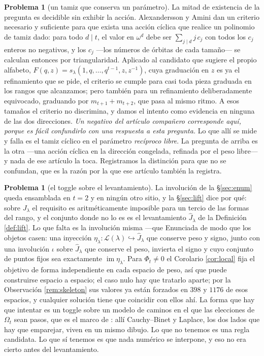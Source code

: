 \documentclass[11pt,reqno]{amsart}
\theoremstyle{plain}
\theoremstyle{definition}
\newtheorem{problem}[theorem]{Problema}
\begin{document}
\begin{problem}[un tamiz que conserva un parámetro]
La mitad de existencia de la pregunta es decidible sin exhibir la acción. Alexandersson y Amini
\cite{AA19} dan un criterio necesario y suficiente para que exista una acción cíclica que realice un
polinomio de tamiz dado: para todo $d\mid t$, el valor en $\omega^d$ debe ser
$\sum_{j\mid d}j\,c_j$ con todos los $c_j$ enteros no negativos, y los $c_j$ ---los números de
órbitas de cada tamaño--- se calculan entonces por triangularidad. Aplicado al candidato que sugiere
el propio alfabeto, $F(q,z)=s_\lambda(1,q,\dots,q^{t-1},z,z^{-1})$, cuya graduación en $z$ es ya el
refinamiento que se pide, el criterio se cumple para casi toda pieza graduada en los rangos que
alcanzamos; pero también para un refinamiento deliberadamente equivocado, graduando por
$m_{t+1}+m_{t+2}$, que pasa al mismo ritmo. A esos tamaños el criterio no discrimina, y damos el
intento como evidencia en ninguna de las dos direcciones.
\emph{Un negativo del artículo compañero \cite{PaperII} corresponde aquí, porque es fácil
confundirlo con una respuesta a esta pregunta.} Lo que allí se mide y falla es el tamiz cíclico en
el parámetro \emph{recíproco libre}. La pregunta de arriba es la otra ---una acción cíclica en la
dirección congelada, refinada por el peso libre--- y nada de ese artículo la toca. Registramos la
distinción para que no se confundan, que es la razón por la que ese artículo también la registra.
\end{problem}

\begin{problem}[el toggle sobre el levantamiento]\label{prob:toggle}
La involución de la \S\ref{sec:enum} queda ensamblada en $t=2$ y en ningún otro sitio, y la
\S\ref{sec:lift} dice por qué: sobre $J_\lambda$ el requisito es aritméticamente imposible para un
tercio de las formas del rango, y el conjunto donde no lo es es el levantamiento
$\widehat J_\lambda$ de la Definición \ref{def:lift}. Lo que falta es la involución misma ---que
Enunciada de modo que los objetos casen: una inyección
$\eta_\lambda:\mathcal L(\lambda)\hookrightarrow\widehat J_\lambda$ que conserve peso y signo,
junto con una involución $\iota$ sobre $\widehat J_\lambda$ que conserve el peso, invierta el signo y
cuyo conjunto de puntos fijos sea exactamente $\operatorname{im}\eta_\lambda$. Para $\Phi_t\ne0$ el Corolario \ref{cor:local} fija el objetivo de forma independiente en cada
espacio de peso, así que puede construirse espacio a espacio; el caso nulo hay que tratarlo aparte; por la Observación \ref{rem:skeleton} sus valores ya están forzados en $398$ y
$1176$ de esos espacios, y cualquier solución tiene que coincidir con ellos ahí. La forma que hay
que intentar es un toggle sobre un modelo de caminos en el que las elecciones de $\Omega_t$ sean
pasos, que es el marco de \cite{Fulmek}: allí Cauchy--Binet y Laplace, los dos lados que hay que
emparejar, viven en un mismo dibujo. Lo que no tenemos es una regla candidata. Lo que sí tenemos es
que nada numérico se interpone, y eso no era cierto antes del levantamiento.
\end{problem}
\end{document}
